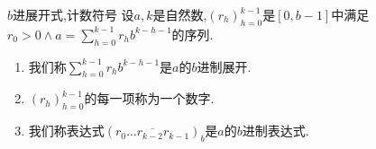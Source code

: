 \begin{definition}{$b$进展开式,计数符号}{}
	设$a,k$是自然数,$\left(r_{h}\right)_{h=0}^{k-1}$是$\left[0,b-1\right]$中满足$r_{0}>0\wedge a=\sum\limits_{h=0}^{k-1}r_{h}b^{k-h-1}$的序列.
	\begin{enumerate}
		\item 我们称$\sum\limits_{h=0}^{k-1}r_{h}b^{k-h-1}$是$a$的$b$进制展开.
		\item $\left(r_{h}\right)_{h=0}^{k-1}$的每一项称为一个数字.
		\item 我们称表达式$\left(\overline{r_{0}\ldots r_{k-2}r_{k-1}}\right)_{b}$是$a$的$b$进制表达式.
	\end{enumerate}
\end{definition}














































































